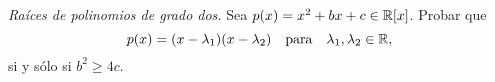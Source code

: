\item \textit{Raíces de polinomios de grado dos.} Sea $p(x)=x^2+bx+c\in\mathbb{R}[x]$. Probar que 
\[p(x)=(x-\lambda_1)(x-\lambda_2)\quad\text{para}\quad\lambda_1,\lambda_2\in\mathbb{R},\]
    si y sólo si $b^2\geq 4c$.
    \begin{mdframed}[style=s]
        
    \end{mdframed}